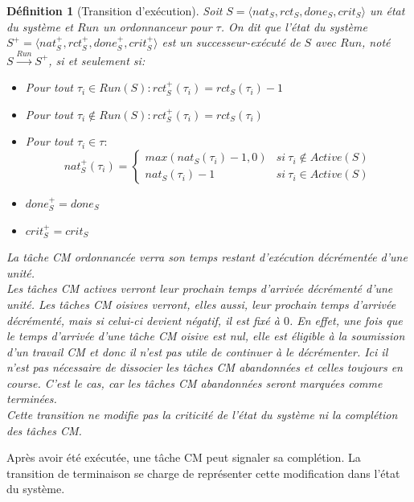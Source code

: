 \documentclass[12pt,a4paper,oneside]{book}
\theoremstyle{break}
\newtheorem{defin}{Définition}[chapter]
\theoremstyle{breakplain}
\begin{document}
\begin{defin}[Transition d'exécution]
\label{spo:texec}
Soit $S = \langle nat_S, rct_S, done_S, crit_S \rangle$ un état du système et $Run$ un \textit{ordonnanceur} pour $\tau$. On dit que l'état du système $S^+ = \langle nat_S^+, rct_S^+, done_S^+, crit_S^+ \rangle$ est un \textit{successeur-exécuté} de $S$ avec $Run$, noté $S\xrightarrow{Run}S^+$, si et seulement si:
\begin{itemize}
\item Pour tout $\tau_i \in Run(S) : rct_S^+(\tau_i) = rct_S(\tau_i)-1$
\item Pour tout $\tau_i \not \in Run(S) : rct_S^+(\tau_i) = rct_S(\tau_i)$
\item Pour tout $\tau_i \in \tau :$
$$ nat_S^+(\tau_i) = \left\{
    \begin{array}{ll}
        max(nat_S(\tau_i)-1, 0) & si\ \tau_i \notin Active(S) \\
        nat_S(\tau_i)-1 & si\ \tau_i \in Active(S) 
    \end{array}
\right.
$$
\item $done_{S}^{+} = done_{S}$
\item $crit_{S}^{+} = crit_{S}$\\
\end{itemize}

La tâche CM ordonnancée verra son temps restant d'exécution décrémentée d'une unité.\\

Les tâches CM actives verront leur prochain temps d'arrivée décrémenté d'une unité. Les tâches CM oisives verront, elles aussi, leur prochain temps d'arrivée décrémenté, mais si celui-ci devient négatif, il est fixé à $0$. En effet, une fois que le temps d'arrivée d'une tâche CM oisive est nul, elle est éligible à la soumission d'un travail CM et donc il n'est pas utile de continuer à le décrémenter. Ici il n'est pas nécessaire de dissocier les tâches CM abandonnées et celles toujours en course. C'est le cas, car les tâches CM abandonnées seront marquées comme terminées.\\

Cette transition ne modifie pas la criticité de l'état du système ni la complétion des tâches CM.
\end{defin}

Après avoir été exécutée, une tâche CM peut signaler sa complétion. La transition de terminaison se charge de représenter cette modification dans l'état du système.\\
\end{document}
